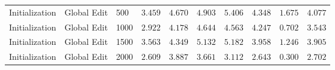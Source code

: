 \begin{table}[H]
{\begin{tabular}{lll|ccccccc}
    Initialization & Global Edit & 500 & $3.459$ & $4.670$ & $4.903$ & $5.406$ & $4.348$ & $1.675$ & $4.077$\\
    Initialization & Global Edit & 1000 & $2.922$ & $4.178$ & $4.644$ & $4.563$ & $4.247$ & $0.702$ & $3.543$\\
    Initialization & Global Edit & 1500 & $3.563$ & $4.349$ & $5.132$ & $5.182$ & $3.958$ & $1.246$ & $3.905$\\
    Initialization & Global Edit & 2000 & $2.609$ & $3.887$ & $3.661$ & $3.112$ & $2.643$ & $0.300$ & $2.702$\\
    \bottomrule
  \end{tabular}%
  }

\end{table}
